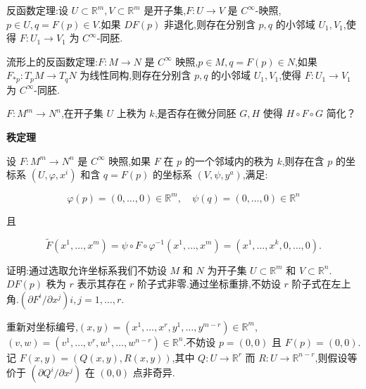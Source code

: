 反函数定理:设 $U \subset \mathbb{R}^m, V \subset \mathbb{R}^m$ 是开子集,$F: U \to V$ 是 $C^\infty$-映照,$p \in U, q = F(p) \in V$.如果 $DF(p)$ 非退化,则存在分别含 $p, q$ 的小邻域 $U_1, V_1$,使得 $F: U_1 \to V_1$ 为 $C^\infty$-同胚.

流形上的反函数定理:$F: M \to N$ 是 $C^\infty$ 映照,$p \in M, q = F(p) \in N$,如果 $F_{*p}: T_pM \to T_qN$ 为线性同构,则存在分别含 $p, q$ 的小邻域 $U_1, V_1$,使得 $F: U_1 \to V_1$ 为 $C^\infty$-同胚.

$F: M^m \to N^n$,在开子集 $U$ 上秩为 $k$,是否存在微分同胚 $G, H$ 使得 $H \circ F \circ G$ 简化？

\textbf{秩定理}

设 $F: M^m \to N^n$ 是 $C^\infty$ 映照,如果 $F$ 在 $p$ 的一个邻域内的秩为 $k$,则存在含 $p$ 的坐标系 $(U, \varphi, x^i)$ 和含 $q = F(p)$ 的坐标系 $(V, \psi, y^a)$,满足:

\[
\varphi(p) = (0, \ldots, 0) \in \mathbb{R}^m, \quad \psi(q) = (0, \ldots, 0) \in \mathbb{R}^n
\]

且

\[
\tilde{F}(x^1, \ldots, x^m) = \psi \circ F \circ \varphi^{-1}(x^1, \ldots, x^m) = (x^1, \ldots, x^k, 0, \ldots, 0).
\]

证明:通过选取允许坐标系我们不妨设 $M$ 和 $N$ 为开子集 $U \subset \mathbb{R}^m$ 和 $V \subset \mathbb{R}^n$.$DF(p)$ 秩为 $r$ 表示其存在 $r$ 阶子式非零.通过坐标重排,不妨设 $r$ 阶子式在左上角.$(\partial F^i / \partial x^j) i, j = 1, \ldots, r$.

重新对坐标编号,$(x, y) = (x^1, \ldots, x^r, y^1, \ldots, y^{m-r}) \in \mathbb{R}^m$,$(v, w) = (v^1, \ldots, v^r, w^1, \ldots, w^{n-r}) \in \mathbb{R}^n$.不妨设 $p = (0, 0)$ 且 $F(p) = (0, 0)$.记 $F(x, y) = (Q(x, y), R(x, y))$,其中 $Q: U \to \mathbb{R}^r$ 而 $R: U \to \mathbb{R}^{n-r}$,则假设等价于 $(\partial Q^i / \partial x^j)$ 在 $(0, 0)$ 点非奇异.

